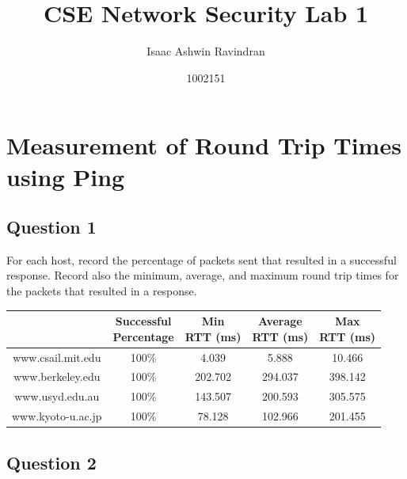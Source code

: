 \documentclass[12pt,a4paper]{article}
\author{Isaac Ashwin Ravindran}
\date{1002151}
\title{CSE Network Security Lab 1}
\begin{document}
	\maketitle
	\newpage
	
	\section{Measurement of Round Trip Times using Ping}
		\subsection{Question 1}
		For each host, record the percentage of packets sent that resulted in a successful response. Record also the minimum, average, and maximum round trip times for the packets that resulted in a response.
	
		\begin{center}
			\begin{tabular}{||c c c c c||} 
 				\hline
				\thead{Location} & \thead{Successful \\ Percentage} & \thead{Min \\ RTT (ms)} & \thead{Average \\ RTT (ms)} & \thead{Max \\ RTT (ms)} \\
 				\hline\hline
 				www.csail.mit.edu & 100\% & 4.039 & 5.888 & 10.466 \\ 
 				\hline
 				www.berkeley.edu & 100\% & 202.702 & 294.037 & 398.142 \\ 
 				\hline
				www.usyd.edu.au & 100\% & 143.507 & 200.593 & 305.575 \\ 
 				\hline
				www.kyoto-u.ac.jp & 100\% & 78.128 & 102.966 & 201.455 \\ 
 				\hline
			\end{tabular}
		\end{center}
		
		\subsection{Question 2}
\end{document}
